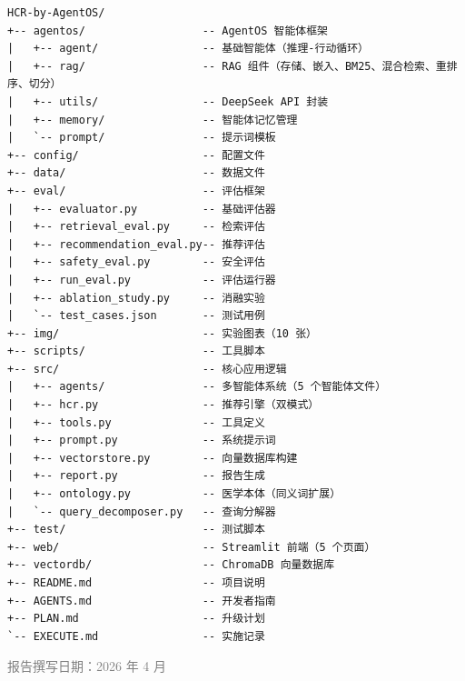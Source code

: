 \documentclass[12pt,a4paper]{article}
\begin{document}
\begin{lstlisting}[language={}, basicstyle=\ttfamily\scriptsize, frame=single, breaklines=true]
HCR-by-AgentOS/
+-- agentos/                  -- AgentOS 智能体框架
|   +-- agent/                -- 基础智能体（推理-行动循环）
|   +-- rag/                  -- RAG 组件（存储、嵌入、BM25、混合检索、重排序、切分）
|   +-- utils/                -- DeepSeek API 封装
|   +-- memory/               -- 智能体记忆管理
|   `-- prompt/               -- 提示词模板
+-- config/                   -- 配置文件
+-- data/                     -- 数据文件
+-- eval/                     -- 评估框架
|   +-- evaluator.py          -- 基础评估器
|   +-- retrieval_eval.py     -- 检索评估
|   +-- recommendation_eval.py-- 推荐评估
|   +-- safety_eval.py        -- 安全评估
|   +-- run_eval.py           -- 评估运行器
|   +-- ablation_study.py     -- 消融实验
|   `-- test_cases.json       -- 测试用例
+-- img/                      -- 实验图表（10 张）
+-- scripts/                  -- 工具脚本
+-- src/                      -- 核心应用逻辑
|   +-- agents/               -- 多智能体系统（5 个智能体文件）
|   +-- hcr.py                -- 推荐引擎（双模式）
|   +-- tools.py              -- 工具定义
|   +-- prompt.py             -- 系统提示词
|   +-- vectorstore.py        -- 向量数据库构建
|   +-- report.py             -- 报告生成
|   +-- ontology.py           -- 医学本体（同义词扩展）
|   `-- query_decomposer.py   -- 查询分解器
+-- test/                     -- 测试脚本
+-- web/                      -- Streamlit 前端（5 个页面）
+-- vectordb/                 -- ChromaDB 向量数据库
+-- README.md                 -- 项目说明
+-- AGENTS.md                 -- 开发者指南
+-- PLAN.md                   -- 升级计划
`-- EXECUTE.md                -- 实施记录
\end{lstlisting}

\vfill
\begin{center}
    \textcolor{gray}{\small 报告撰写日期：2026 年 4 月}
\end{center}
\end{document}
